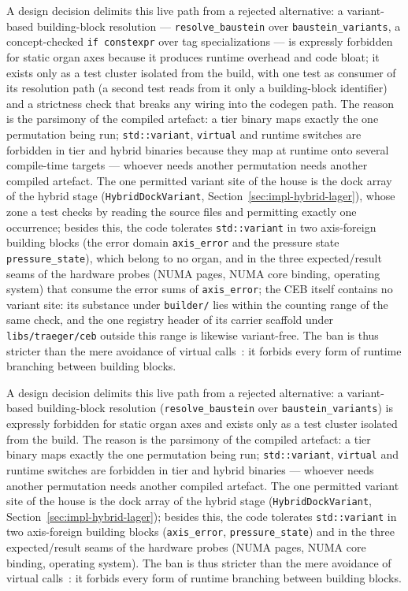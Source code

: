 \begin{nurlang}
A design decision delimits this live path from a rejected alternative: a variant-based building-block
resolution --- \texttt{resolve\_baustein} over \texttt{baustein\_variants}, a concept-checked
\texttt{if constexpr} over tag specializations --- is expressly forbidden for static organ axes because
it produces runtime overhead and code bloat; it exists only as a test cluster isolated from the build,
with one test as consumer of its resolution path (a second test reads from it only a building-block
identifier) and a strictness check that breaks any wiring into the codegen path. The reason is the
parsimony of the compiled artefact: a tier binary maps exactly the one permutation being run;
\texttt{std::variant}, \texttt{virtual} and runtime switches are forbidden in tier and hybrid binaries
because they map at runtime onto several compile-time targets --- whoever needs another permutation
needs another compiled artefact. The one permitted variant site of the house is the dock array of the
hybrid stage (\texttt{HybridDockVariant}, Section~\ref{sec:impl-hybrid-lager}), whose zone a test
checks by reading the source files and permitting exactly one occurrence; besides this, the code
tolerates \texttt{std::variant} in two axis-foreign building blocks (the error domain
\texttt{axis\_error} and the pressure state \texttt{pressure\_state}), which belong to no organ, and in
the three expected/result seams of the hardware probes (NUMA pages, NUMA core binding, operating
system) that consume the error sums of \texttt{axis\_error}; the CEB itself contains no variant site:
its substance under \texttt{builder/} lies within the counting range of the same check, and the one
registry header of its carrier scaffold under \texttt{libs/traeger/ceb} outside this range is likewise
variant-free. The ban is thus stricter than the mere avoidance of virtual
calls~\cite{alexandrescu2001modern}: it forbids every form of runtime branching between building
blocks.
\end{nurlang}
\begin{nurkurz}
A design decision delimits this live path from a rejected alternative: a variant-based building-block
resolution (\texttt{resolve\_baustein} over \texttt{baustein\_variants}) is expressly forbidden for
static organ axes and exists only as a test cluster isolated from the build. The reason is the parsimony
of the compiled artefact: a tier binary maps exactly the one permutation being run;
\texttt{std::variant}, \texttt{virtual} and runtime switches are forbidden in tier and hybrid binaries
--- whoever needs another permutation needs another compiled artefact. The one permitted variant site
of the house is the dock array of the hybrid stage (\texttt{HybridDockVariant},
Section~\ref{sec:impl-hybrid-lager}); besides this, the code tolerates \texttt{std::variant} in two
axis-foreign building blocks (\texttt{axis\_error}, \texttt{pressure\_state}) and in the three
expected/result seams of the hardware probes (NUMA pages, NUMA core binding, operating system). The ban
is thus stricter than the mere avoidance of virtual calls~\cite{alexandrescu2001modern}: it forbids
every form of runtime branching between building blocks.
\end{nurkurz}

